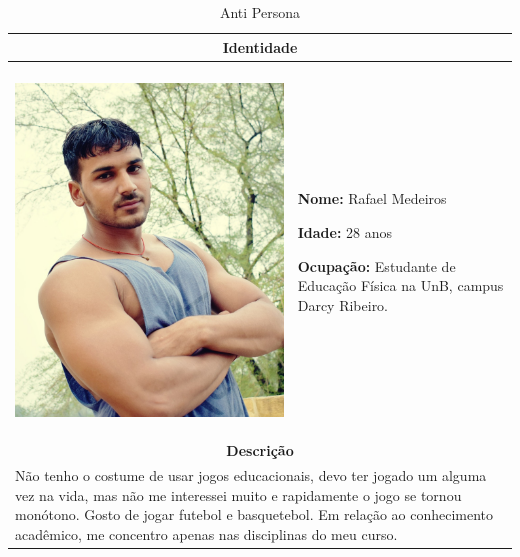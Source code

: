 

\begin{table}[htbp]
\centering
\caption{Anti Persona}
\label{tab:Table_persona4}
\small
\begin{tabular}{| m{} m{}|}
\hline \multicolumn{2}{|c|}{\textbf{Identidade}} \\ \hline
& \\

\begin{center} \includegraphics[scale=0.06]{figuras/personas/man-1209494_1920.jpg} \end{center} 

&

\textbf{Nome: }  Rafael Medeiros

\textbf{Idade:} 28 anos

\textbf{Ocupação:} Estudante de Educação Física na UnB, campus Darcy Ribeiro.

\\ \hline


\multicolumn{2}{|c|}{\textbf{Descrição}} \\ \hline
\multicolumn{2}{|p{15cm}|}{
        Não tenho o costume de usar jogos educacionais, devo ter jogado um alguma vez na vida, mas não me interessei muito e rapidamente o jogo se tornou monótono. Gosto de jogar futebol e basquetebol. Em relação ao conhecimento acadêmico, me concentro apenas nas disciplinas do meu curso.
        
}
\end{tabular}
\end{table}
